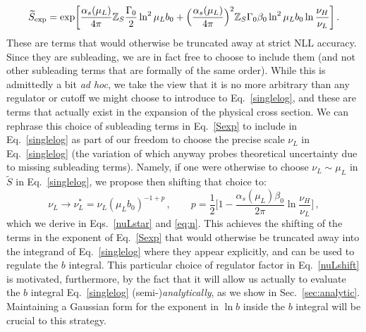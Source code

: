 \documentclass[a4,letterpaper,11pt]{article}
\newcommand{\be}{\begin{equation}}
\newcommand{\ee}{\end{equation}}
\newcommand{\as}{\alpha_s}
\newcommand{\zed}{\mathbb{Z}}
\newcommand{\wt}{\widetilde}
\newcommand{\eq}[1]{Eq.~\eqref{#1}}
\newcommand{\eqs}[2]{Eqs.~\eqref{#1} and \eqref{#2}}
\renewcommand{\sec}[1]{Sec.~\ref{sec:#1}}
\begin{document}
\be
\label{Sexp}
\wt S_{\text{exp}} = \exp \biggl[ \frac{\as(\mu_L)}{4\pi}\zed_S \frac{\Gamma_0}{2} \ln^2 \mu_L b_0 + \Bigl(\frac{\as(\mu_L)}{4\pi}\Bigr)^2 \zed_S \Gamma_0 \beta_0 \ln^2\mu_L b_0 \ln \frac{\nu_H}{\nu_L}\biggr]\,.
\ee
These are terms that would otherwise be truncated away at strict NLL accuracy. Since they are subleading, we are in fact free to choose to include them (and not other subleading terms that are formally of the same order). While this is admittedly a bit \emph{ad hoc}, we take the view that it is no more arbitrary than any regulator or cutoff we might choose to introduce to \eq{singlelog}, and these are terms that actually exist in the expansion of the physical cross section. We can rephrase this choice of subleading terms in \eq{Sexp} to include in \eq{singlelog} as part of our freedom to choose the precise scale $\nu_L$ in \eq{singlelog} (the variation of which anyway probes theoretical uncertainty due to missing subleading terms).  Namely, if one were otherwise to choose $\nu_L\sim \mu_L$ in $\wt S$ in \eq{singlelog}, we propose then shifting that choice to:
\be
\label{nuLshift}
\nu_L\to \nu_L^* = \nu_L(\mu_L b_0)^{-1+p}\,,\qquad p = \frac{1}{2}\biggl[ 1 - \frac{\as(\mu_L)\beta_0}{2\pi}\ln\frac{\nu_H}{\nu_L}\biggr]\,,
\ee
which we derive in \eqs{nuLstar}{eq:n}. This achieves the shifting of the terms in the exponent of \eq{Sexp} that would otherwise be truncated away into the integrand of \eq{singlelog} where they appear explicitly, and can be used to regulate the $b$ integral. This particular choice of regulator factor in \eq{nuLshift} is motivated, furthermore, by the fact that it will allow us actually to evaluate the $b$ integral \eq{singlelog} (semi-)\emph{analytically}, as we show in \sec{analytic}. Maintaining a Gaussian form for the exponent in $\ln b$ inside the $b$ integral will be crucial to this strategy.
\end{document}
